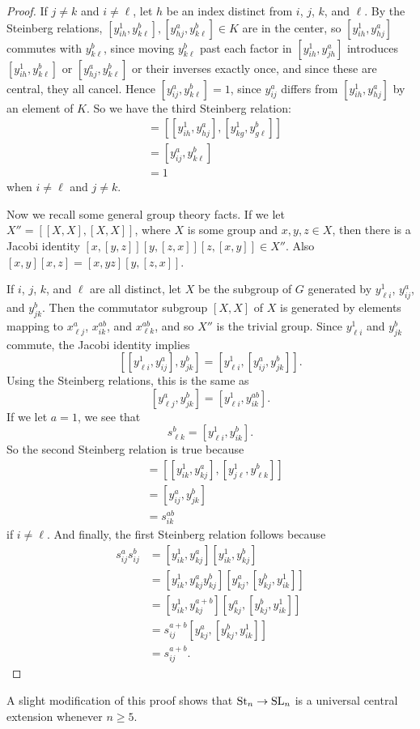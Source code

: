 \begin{proof}
    If $j \neq k$ and $i \neq \ell$, let $h$ be an index distinct from $i$, $j$, $k$, and $\ell$. By the Steinberg relations, $[y_{ih}^1, y_{k\ell}^b], [y_{hj}^a, y_{k\ell}^b] \in K$ are in the center, so $[y_{ih}^1, y_{hj}^a]$ commutes with $y_{k\ell}^b$, since moving $y_{k\ell}^b$ past each factor in $[y_{ih}^1, y_{jh}^a]$ introduces $[y_{ih}^1, y_{k\ell}^b]$ or $[y_{hj}^a, y_{k\ell}^b]$ or their inverses exactly once, and since these are central, they all cancel. Hence $[y_{ij}^a, y_{k\ell}^b] = 1$, since $y_{ij}^a$ differs from $[y_{ih}^1, y_{hj}^a]$ by an element of $K$. So we have the third Steinberg relation:
    \begin{align*}
        [s_{ij}^a, s_{k\ell}^b] & = [[y_{ih}^1, y_{hj}^a], [y_{kg}^1, y_{g\ell}^b]] \\
        & = [y_{ij}^a, y_{k\ell}^b] \\
        & = 1
    \end{align*}
    when $i \neq \ell$ and $j \neq k$.

    Now we recall some general group theory facts. If we let $X'' = [[X, X], [X, X]]$, where $X$ is some group and $x, y, z \in X$, then there is a Jacobi identity $[x, [y, z]][y, [z, x]][z, [x, y]] \in X''$. Also $[x, y][x, z] = [x, yz][y, [z, x]]$.

    If $i$, $j$, $k$, and $\ell$ are all distinct, let $X$ be the subgroup of $G$ generated by $y_{\ell i}^1$, $y_{ij}^a$, and $y_{jk}^b$. Then the commutator subgroup $[X, X]$ of $X$ is generated by elements mapping to $x_{\ell j}^a$, $x_{ik}^{ab}$, and $x_{\ell k}^{ab}$, and so $X''$ is the trivial group. Since $y_{\ell i}^1$ and $y_{jk}^b$ commute, the Jacobi identity implies
    \[
        [[y_{\ell i}^1, y_{ij}^a], y_{jk}^b] = [y_{\ell i}^1, [y_{ij}^a, y_{jk}^b]].
    \]
    Using the Steinberg relations, this is the same as
    \[
        [y_{\ell j}^a, y_{jk}^b] = [y_{\ell i}^1, y_{ik}^{ab}].
    \]
    If we let $a = 1$, we see that
    \[
        s_{\ell k}^b = [y_{\ell i}^1, y_{i k}^b].
    \]
    So the second Steinberg relation is true because
    \begin{align*}
        [s_{ij}^a, s_{jk}^b] & = [[y_{ik}^1, y_{kj}^a], [y_{j\ell}^1, y_{\ell k}^b]] \\
        & = [y_{ij}^a, y_{jk}^b] \\
        & = s_{ik}^{ab}
    \end{align*}
    if $i \neq \ell$. And finally, the first Steinberg relation follows because
    \begin{align*}
        s_{ij}^a s_{ij}^b & = [y_{ik}^1, y_{kj}^a][y_{ik}^1, y_{kj}^b] \\
        & = [y_{ik}^1, y_{kj}^a y_{kj}^b] [y_{kj}^a, [y_{kj}^b, y_{ik}^1]] \\
        & = [y_{ik}^1, y_{kj}^{a + b}] [y_{kj}^a, [y_{kj}^b, y_{ik}^1]] \\
        & = s_{ij}^{a + b} [y_{kj}^a, [y_{kj}^b, y_{ik}^1]] \\
        & = s_{ij}^{a + b}.
    \end{align*}
\end{proof}
A slight modification of this proof shows that $\mathrm{St}_n \to \mathrm{SL}_n$ is a universal central extension whenever $n \geq 5$.

